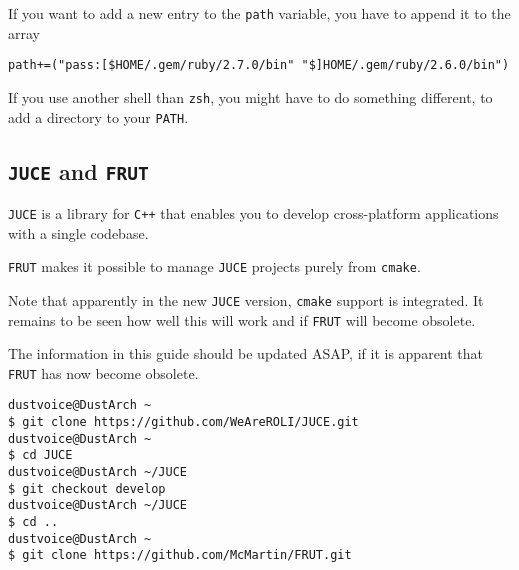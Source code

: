 \documentclass[10pt]{dustdoc}
\begin{document}
\begin{NOTE}
    If you want to add a new entry to the \texttt{path} variable, you have to append it to the array

    \begin{verbatim}
path+=("pass:[$HOME/.gem/ruby/2.7.0/bin" "$]HOME/.gem/ruby/2.6.0/bin")
    \end{verbatim}
\end{NOTE}
\begin{NOTE}
    If you use another shell than \texttt{zsh}, you might have to do something different, to add a directory to your \texttt{PATH}.

\end{NOTE}

\subsection{\texttt{JUCE} and \texttt{FRUT}}
\label{sec:juce-and-frut}

\texttt{JUCE} is a library for \texttt{C++} that enables you to develop cross-platform applications with a single codebase.

\texttt{FRUT} makes it possible to manage \texttt{JUCE} projects purely from \texttt{cmake}.


\begin{NOTE}
    Note that apparently in the new \texttt{JUCE} version, \texttt{cmake} support is integrated.
    It remains to be seen how well this will work and if \texttt{FRUT} will become obsolete.

    The information in this guide should be updated ASAP, if it is apparent that \texttt{FRUT} has now become obsolete.
\end{NOTE}

\begin{verbatim}
dustvoice@DustArch ~
$ git clone https://github.com/WeAreROLI/JUCE.git
dustvoice@DustArch ~
$ cd JUCE
dustvoice@DustArch ~/JUCE
$ git checkout develop
dustvoice@DustArch ~/JUCE
$ cd ..
dustvoice@DustArch ~
$ git clone https://github.com/McMartin/FRUT.git
\end{verbatim}
\end{document}
